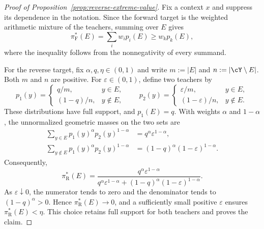 \documentclass[11pt]{article}
\newcommand{\pif}{\pi_{\mathrm{F}}}
\newcommand{\pir}{\pi_{\mathrm{R}}}
\begin{document}
\begin{proof}[Proof of Proposition~\ref{prop:reverse-extreme-value}]
Fix a context $x$ and suppress its dependence in the notation. Since the forward target is the weighted arithmetic mixture of the teachers, summing over $E$ gives
\[
    \pif^*(E)=\sum_i w_i p_i(E)\geq w_kp_k(E),
\]
where the inequality follows from the nonnegativity of every summand.

For the reverse target, fix $\alpha,q,\eta\in(0,1)$ and write $m:=|E|$ and $n:=|\cY\setminus E|$. Both $m$ and $n$ are positive. For $\varepsilon\in(0,1)$, define two teachers by
\[
    p_1(y)=
    \begin{cases}
        q/m, & y\in E,\\
        (1-q)/n, & y\notin E,
    \end{cases}
    \qquad
    p_2(y)=
    \begin{cases}
        \varepsilon/m, & y\in E,\\
        (1-\varepsilon)/n, & y\notin E.
    \end{cases}
\]
These distributions have full support, and $p_1(E)=q$. With weights $\alpha$ and $1-\alpha$, the unnormalized geometric masses on the two sets are
\begin{align*}
    \sum_{y\in E}p_1(y)^\alpha p_2(y)^{1-\alpha}
    &=q^\alpha\varepsilon^{1-\alpha},\\
    \sum_{y\notin E}p_1(y)^\alpha p_2(y)^{1-\alpha}
    &=(1-q)^\alpha(1-\varepsilon)^{1-\alpha}.
\end{align*}
Consequently,
\[
    \pir^*(E)
    =\frac{q^\alpha\varepsilon^{1-\alpha}}
    {q^\alpha\varepsilon^{1-\alpha}+(1-q)^\alpha(1-\varepsilon)^{1-\alpha}}.
\]
As $\varepsilon\downarrow0$, the numerator tends to zero and the denominator tends to $(1-q)^\alpha>0$. Hence $\pir^*(E)\to0$, and a sufficiently small positive $\varepsilon$ ensures $\pir^*(E)<\eta$. This choice retains full support for both teachers and proves the claim.
\end{proof}
\end{document}
